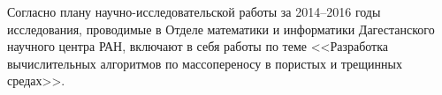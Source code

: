 \Introduction

Согласно плану научно-исследовательской работы за 2014--2016 годы исследования, проводимые в Отделе математики и информатики Дагестанского научного центра РАН, включают в себя работы по теме
<<Разработка вычислительных алгоритмов по массопереносу в пористых и трещинных средах>>.






